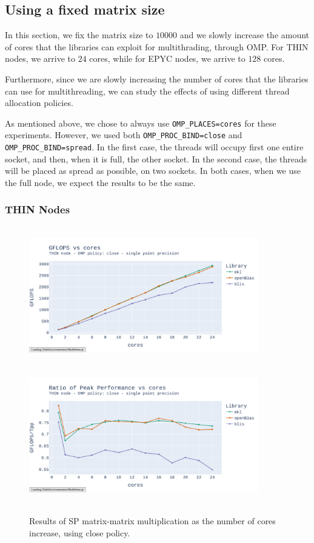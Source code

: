 \documentclass{report}
\begin{document}
\subsection{Using a fixed matrix size}

In this section, we fix the matrix size to $10000$ and we slowly increase the 
amount of cores that the libraries can exploit for multithrading, through OMP. 
For THIN nodes, we arrive to $24$ cores, while for EPYC nodes, we arrive to $128$ 
cores.

Furthermore, since we are slowly increasing the number of cores that the libraries 
can use for multithreading, we can study the effects of using different 
thread allocation policies.

As mentioned above, we chose to always use \texttt{OMP\_PLACES=cores} for these 
experiments. However, we used both \texttt{OMP\_PROC\_BIND=close} and 
\texttt{OMP\_PROC\_BIND=spread}. In the first case, the threads will occupy first 
one entire socket, and then, when it is full, the other socket. In the second case, 
the threads will be placed as spread as possible, on two sockets. 
In both cases, when we use the full node, we expect the results to be the same.

\subsubsection{THIN Nodes}
\begin{figure}[h!]
\hspace*{-2.5cm}
\includegraphics[width=10cm, height=6cm]{./images/fixed_size_thin_float_gflops_close.pdf}
\includegraphics[width=10cm, height=6cm]{./images/fixed_size_thin_float_gflops_close_ratio.pdf}
\caption{\label{fig:fixed_size_thin_float_close} Results of SP matrix-matrix multiplication 
    as the number of cores increase, using close policy.}
\end{figure}
\end{document}
